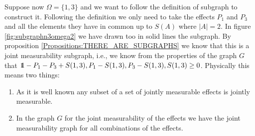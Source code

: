 \documentclass[10pt, a4paper]{amsart}
\begin{document}
Suppose now $\Omega = \{1,3\}$ and we want to follow the definition of subgraph to construct it. Following the definition we only need to 
take the effects $P_{1}$ and $P_{3}$ and all the elements they have in common up to $S(A)$ where $|A| = 2$. In figure \ref{fig:subgraphn3omega2} we have drawn too in solid lines the subgraph. By proposition \ref{Propositions:THERE_ARE_SUBGRAPHS} we know that this is a joint measurability subgraph, i.e., we know from the properties of the graph $G$ that 
$\bbone - P_{1}-P_{3} + S(1,3), P_{1}-S(1,3), P_{3}-S(1,3), S(1,3)\geq 0 $. Physically this means two things:
\begin{enumerate}
\item As it is well known any subset of a set of jointly measurable effects is jointly measurable.
\item In the graph $G$ for the joint measurability of the effects we have the joint measurability graph for all combinations of the effects. 
\end{enumerate}
 
 
 
 
 
 
 
 
 
 
 
 
 
 
 
 
 
 
 
 
 
 
 
 
 
\newpage
\end{document}
